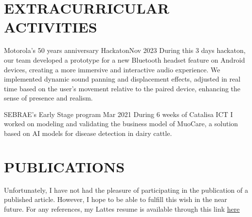 \documentclass[letterpaper,11pt]{article}
\begin{document}

\resumeItemListEnd


\section{\texorpdfstring{EXTRACURRICULAR ACTIVITIES}{EXTRACURRICULAR
ACTIVITIES}}
\resumeSubHeadingListStart

\resumeProjectHeading
{Motorola's 50 years anniversary Hackaton}{Nov 2023}
During this 3 days hackaton, our team developed a prototype for a new
Bluetooth
headset feature on Android devices, creating a more immersive and interactive
audio experience. We implemented dynamic sound panning and displacement
effects, adjusted in real time based on the user's movement relative to the
paired device, enhancing the sense of presence and realism.

\resumeProjectHeading
{SEBRAE's Early Stage program} {Mar 2021}
During 6 weeks of Catalisa ICT I worked on modeling and validating the
business
model of MuoCare, a solution based on AI models for disease detection in dairy
cattle.


\resumeSubHeadingListEnd


\section{\texorpdfstring{PUBLICATIONS}{PUBLICATIONS}}

{Unfortunately, I have not had the pleasure of participating in the
publication
of a published article. However, I hope to be able to fulfill this wish in the
near future. For any references, my Lattes resume is available through this
link}
\href{[http://lattes.cnpq.br/0278549043500928]}{\color{blue}\underline{here}}


\end{document}
